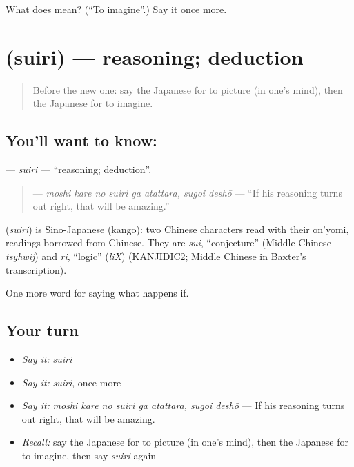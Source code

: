 \begin{tcolorbox}[breakable,colback=teal!4,colframe=teal!35!black,title={Before you move on}]
What does  mean? (\textquotedblleft{}To imagine\textquotedblright{}.) Say it once more.
\end{tcolorbox}
\section[\texorpdfstring{\ja{すいり} (suiri)}{すいり (suiri)}]{ (suiri) — reasoning; deduction}

\label{lesson:JA-C524-suiri}



\begin{quote}
Before the new one: say the Japanese for to picture (in one's mind), then the Japanese for to imagine.
\end{quote}

\subsection*{You'll want to know: }
\textbf{} — \emph{suiri} — \textquotedblleft{}reasoning; deduction\textquotedblright{}.

\begin{quote}
\textbf{   } — \emph{moshi kare no suiri ga atattara, sugoi deshō} — \textquotedblleft{}If his reasoning turns out right, that will be amazing.\textquotedblright{}
\end{quote}

\begin{cousinweb}
\textbf{} (\emph{suiri}) is Sino-Japanese (kango): two Chinese characters read with their on'yomi, readings borrowed from Chinese. They are \emph{sui}, \textquotedblleft{}conjecture\textquotedblright{} (Middle Chinese \emph{tsyhwij}) and \emph{ri}, \textquotedblleft{}logic\textquotedblright{} (\emph{liX}) (KANJIDIC2; Middle Chinese in Baxter's transcription).
\end{cousinweb}

\begin{grammarlens}[title={What you've built}]
One more word for saying what happens if.
\end{grammarlens}

\subsection*{Your turn}
\begin{itemize}
\raggedright
  \item \emph{Say it:} \emph{suiri}
  \item \emph{Say it:} \emph{suiri}, once more
  \item \emph{Say it:} \emph{moshi kare no suiri ga atattara, sugoi deshō} — If his reasoning turns out right, that will be amazing.
  \item \emph{Recall:} say the Japanese for to picture (in one's mind), then the Japanese for to imagine, then say \emph{suiri} again
\end{itemize}

